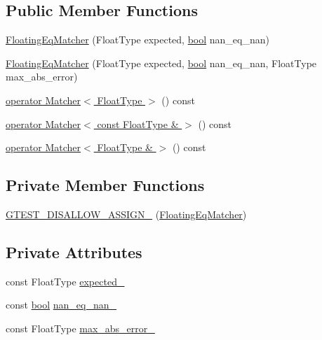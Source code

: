 \subsection*{Public Member Functions}
\begin{DoxyCompactItemize}
\item 
\hyperlink{classtesting_1_1internal_1_1FloatingEqMatcher_a92b08d1635c900fa8571ff4eff30b4bb}{Floating\+Eq\+Matcher} (Float\+Type expected, \hyperlink{classbool}{bool} nan\+\_\+eq\+\_\+nan)
\item 
\hyperlink{classtesting_1_1internal_1_1FloatingEqMatcher_a07674c4b017965493a3c20a218f9a74f}{Floating\+Eq\+Matcher} (Float\+Type expected, \hyperlink{classbool}{bool} nan\+\_\+eq\+\_\+nan, Float\+Type max\+\_\+abs\+\_\+error)
\item 
\hyperlink{classtesting_1_1internal_1_1FloatingEqMatcher_abd377dfafd89bdb7effdd80989aeee80}{operator Matcher$<$ Float\+Type $>$} () const
\item 
\hyperlink{classtesting_1_1internal_1_1FloatingEqMatcher_a5419859a104ad44ce6c35732efebc694}{operator Matcher$<$ const Float\+Type \& $>$} () const
\item 
\hyperlink{classtesting_1_1internal_1_1FloatingEqMatcher_ae75e5b64f04010c5580312562fcf98e5}{operator Matcher$<$ Float\+Type \& $>$} () const
\end{DoxyCompactItemize}
\subsection*{Private Member Functions}
\begin{DoxyCompactItemize}
\item 
\hyperlink{classtesting_1_1internal_1_1FloatingEqMatcher_af002f051e277179e50194d85b96ad043}{G\+T\+E\+S\+T\+\_\+\+D\+I\+S\+A\+L\+L\+O\+W\+\_\+\+A\+S\+S\+I\+G\+N\+\_\+} (\hyperlink{classtesting_1_1internal_1_1FloatingEqMatcher}{Floating\+Eq\+Matcher})
\end{DoxyCompactItemize}
\subsection*{Private Attributes}
\begin{DoxyCompactItemize}
\item 
const Float\+Type \hyperlink{classtesting_1_1internal_1_1FloatingEqMatcher_a01d4d3ee6344cd3d88c53dd6e730b9df}{expected\+\_\+}
\item 
const \hyperlink{classbool}{bool} \hyperlink{classtesting_1_1internal_1_1FloatingEqMatcher_a782b06cb55b4989c3c67facf910265bf}{nan\+\_\+eq\+\_\+nan\+\_\+}
\item 
const Float\+Type \hyperlink{classtesting_1_1internal_1_1FloatingEqMatcher_a06b3fd6f9ee60bc694a12ccaeba2924a}{max\+\_\+abs\+\_\+error\+\_\+}
\end{DoxyCompactItemize}


